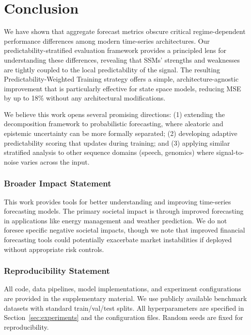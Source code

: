 \documentclass[10pt]{article}
\begin{document}
\section{Conclusion}
\label{sec:conclusion}

We have shown that aggregate forecast metrics obscure critical regime-dependent performance differences among modern time-series architectures. Our predictability-stratified evaluation framework provides a principled lens for understanding these differences, revealing that SSMs' strengths and weaknesses are tightly coupled to the local predictability of the signal. The resulting Predictability-Weighted Training strategy offers a simple, architecture-agnostic improvement that is particularly effective for state space models, reducing MSE by up to 18\% without any architectural modifications.

We believe this work opens several promising directions: (1) extending the decomposition framework to probabilistic forecasting, where aleatoric and epistemic uncertainty can be more formally separated; (2) developing adaptive predictability scoring that updates during training; and (3) applying similar stratified analysis to other sequence domains (speech, genomics) where signal-to-noise varies across the input.

\subsubsection*{Broader Impact Statement}
This work provides tools for better understanding and improving time-series forecasting models. The primary societal impact is through improved forecasting in applications like energy management and weather prediction. We do not foresee specific negative societal impacts, though we note that improved financial forecasting tools could potentially exacerbate market instabilities if deployed without appropriate risk controls.

\subsubsection*{Reproducibility Statement}
All code, data pipelines, model implementations, and experiment configurations are provided in the supplementary material. We use publicly available benchmark datasets with standard train/val/test splits. All hyperparameters are specified in Section~\ref{sec:experiments} and the configuration files. Random seeds are fixed for reproducibility.
\end{document}
